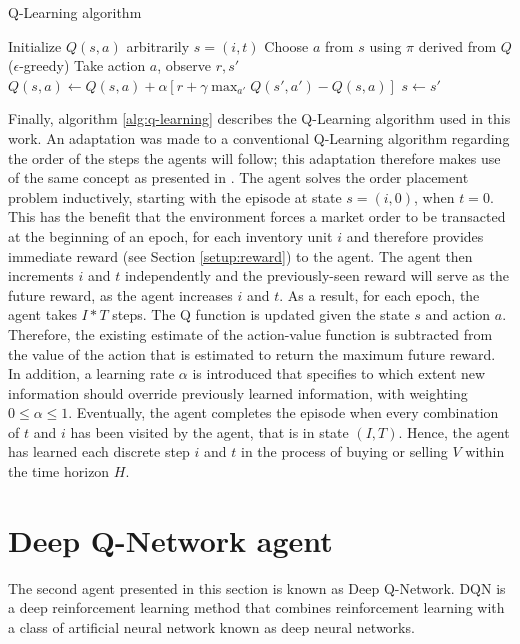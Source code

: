 \begin{algorithm}
\caption{Q-Learning algorithm}\label{alg:q-learning}
\begin{algorithmic}[1]
\State Initialize $Q(s,a)$ arbitrarily
\State $s=(i, t)$
\State Choose $a$ from $s$ using $\pi$ derived from $Q$ ($\epsilon$-greedy)
\State Take action $a$, observe $r, s'$
\State $Q(s,a) \gets Q(s,a)+ \alpha[r+ \gamma \max_{a'}Q(s',a')-Q(s,a)]$
\State $s \gets s'$
\EndFor
\EndFor
\EndFor
\end{algorithmic}
\end{algorithm}
Finally, algorithm \ref{alg:q-learning} describes the Q-Learning algorithm used in this work.
An adaptation was made to a conventional Q-Learning algorithm\cite{sutton1998reinforcement} regarding the order of the steps the agents will follow; this adaptation therefore makes use of the same concept as presented in \cite{nevmyvaka2006reinforcement}.
The agent solves the order placement problem inductively, starting with the episode at state $s=(i,0)$, when $t=0$.
This has the benefit that the environment forces a market order to be transacted at the beginning of an epoch, for each inventory unit $i$ and therefore provides immediate reward (see Section \ref{setup:reward}) to the agent.
The agent then increments $i$ and $t$ independently and the previously-seen reward will serve as the future reward, as the agent increases $i$ and $t$.
As a result, for each epoch, the agent takes $I*T$ steps.
The Q function is updated given the state $s$ and action $a$.
Therefore, the existing estimate of the action-value function is subtracted from the value of the action that is estimated to return the maximum future reward.
In addition, a learning rate $\alpha$ is introduced that specifies to which extent new information should override previously learned information, with weighting $0 \le \alpha \le 1$.
Eventually, the agent completes the episode when every combination of $t$ and $i$ has been visited by the agent, that is in state $(I, T)$.
Hence, the agent has learned each discrete step $i$ and $t$ in the process of buying or selling $V$ within the time horizon $H$.

\section{Deep Q-Network agent}
\label{setup:dqn}
The second agent presented in this section is known as Deep Q-Network\cite{mnih2015human}.
DQN is a deep reinforcement learning method that combines reinforcement learning with a class of artificial neural network known as deep neural networks.

